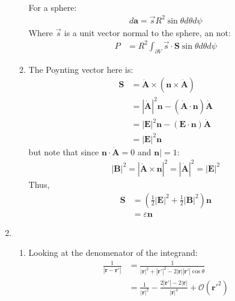 \documentclass[12pt,a4]{article}
\begin{document}
\begin{enumerate}
\begin{enumerate}
\begin{align*}
        \end{align*}
        For a sphere:
        \begin{align*}
          d \mathbf{a} = \vec{s} R^2 \sin \theta d \theta  d \psi
        \end{align*}
        Where $\vec{s}$ is a unit vector normal to the sphere, an not:
        \begin{align*}
          P &= R^2\int_{\partial V} \vec{s} \cdot \mathbf{S}  \sin \theta d \theta  d \psi
        \end{align*}
      \item
        The Poynting vector here is:
        \begin{align*}
          \mathbf{S} &=
          \dot{\mathbf{A}} \times \left(\mathbf{n} \times \dot{\mathbf{A}}\right) \\
                                                  &= |\dot {\mathbf{A}}|^2\mathbf{n} - \left(\dot{\mathbf{A}} \cdot \mathbf{n}\right) \dot{\mathbf{A}}\\
                                                  &= |{\mathbf{E}}|^2\mathbf{n} - \left(\mathbf{E} \cdot \mathbf{n}\right) \dot{\mathbf{A}}\\
                                                  &= |{\mathbf{E}}|^2\mathbf{n} 
        \end{align*}          
        but note that since $\mathbf{n} \cdot \dot{\mathbf{A}} = 0$ and $\mathbf{n}| = 1$:
        \begin{align*}
          |\mathbf{B}|^2 = |\dot{\mathbf{A}} \times \mathbf{n}|^2 = |\dot{\mathbf{A}}|^2 = |\mathbf{E}|^2
        \end{align*}
        Thus,
        \begin{align*}
          \mathbf{S} 
                  &= \left(\frac{1}{2}|{\mathbf{E}}|^2 + \frac{1}{2}|{\mathbf{B}}|^2 \right)\mathbf{n} \\
                  &= \varepsilon\mathbf{n} 
        \end{align*}          
    \end{enumerate}
  \item
    \begin{enumerate}
      \item
        Looking at the denomenator of the integrand:
        \begin{align*}
          \frac{1}{|\mathbf{r} - \mathbf{r}'|} &= \frac{1}{|\mathbf{r}|^2 + |\mathbf{r}'|^2 - 2|\mathbf{r}||\mathbf{r}'|\cos \theta}\\
                                               &= \frac{1}{|\mathbf{r}|^2} - \frac{2 |\mathbf{r}'| - 2|\mathbf{r}|}{|\mathbf{r}|^4} + \mathcal{O}(\mathbf{r}'^2)
        \end{align*}
        

\end{enumerate}
\end{enumerate}
\end{document}
